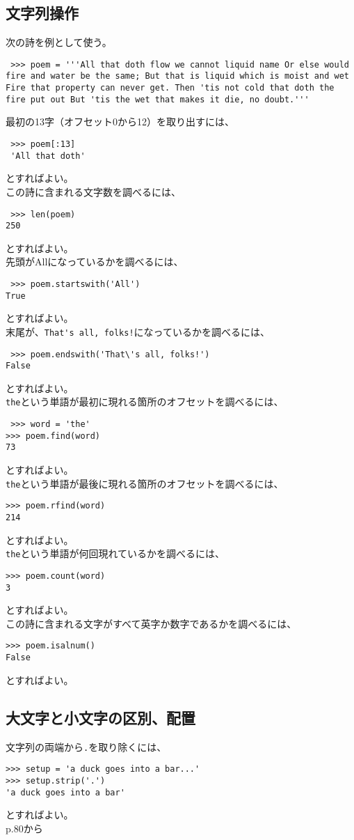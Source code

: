 \documentclass[11pt, oneside]{article}   	%
\begin{document}
  \subsection{文字列操作}
  次の詩を例として使う。
   \begin{lstlisting}
 >>> poem = '''All that doth flow we cannot liquid name Or else would fire and water be the same; But that is liquid which is moist and wet Fire that property can never get. Then 'tis not cold that doth the fire put out But 'tis the wet that makes it die, no doubt.'''
   \end{lstlisting}
  最初の13字（オフセット0から12）を取り出すには、
 \begin{lstlisting}
 >>> poem[:13]
 'All that doth'
 \end{lstlisting}
 とすればよい。\\
 この詩に含まれる文字数を調べるには、
 \begin{lstlisting}
 >>> len(poem)
250
 \end{lstlisting}
 とすればよい。\\
先頭がAllになっているかを調べるには、
\begin{lstlisting}
 >>> poem.startswith('All')
True
 \end{lstlisting}
  とすればよい。\\
末尾が、\verb|That's all, folks!|になっているかを調べるには、
\begin{lstlisting}
 >>> poem.endswith('That\'s all, folks!')
False
 \end{lstlisting}
  とすればよい。\\
  \verb|the|という単語が最初に現れる箇所のオフセットを調べるには、
  \begin{lstlisting}
 >>> word = 'the'
>>> poem.find(word)
73
 \end{lstlisting}
  とすればよい。\\
   \verb|the|という単語が最後に現れる箇所のオフセットを調べるには、
  \begin{lstlisting}
>>> poem.rfind(word)
214
 \end{lstlisting}
  とすればよい。\\
     \verb|the|という単語が何回現れているかを調べるには、
  \begin{lstlisting}
>>> poem.count(word)
3
 \end{lstlisting}
  とすればよい。\\
  この詩に含まれる文字がすべて英字か数字であるかを調べるには、
    \begin{lstlisting}
>>> poem.isalnum()
False
 \end{lstlisting}
  とすればよい。\\
  
   \subsection{大文字と小文字の区別、配置}
   文字列の両端から\verb|.|を取り除くには、
\begin{lstlisting}
>>> setup = 'a duck goes into a bar...'
>>> setup.strip('.')
'a duck goes into a bar'
\end{lstlisting}
  とすればよい。\\
  
  p.80から

 
\end{document}
